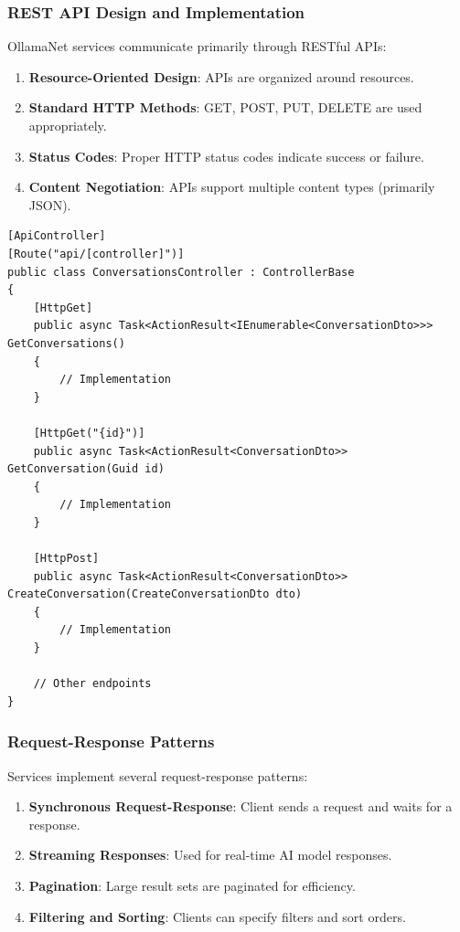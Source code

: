 \subsubsection{REST API Design and Implementation}

OllamaNet services communicate primarily through RESTful APIs:

\begin{enumerate}
   \item \textbf{Resource-Oriented Design}: APIs are organized around resources.
   \item \textbf{Standard HTTP Methods}: GET, POST, PUT, DELETE are used appropriately.
   \item \textbf{Status Codes}: Proper HTTP status codes indicate success or failure.
   \item \textbf{Content Negotiation}: APIs support multiple content types (primarily JSON).
\end{enumerate}

\begin{verbatim}
[ApiController]
[Route("api/[controller]")]
public class ConversationsController : ControllerBase
{
    [HttpGet]
    public async Task<ActionResult<IEnumerable<ConversationDto>>> GetConversations()
    {
        // Implementation
    }
    
    [HttpGet("{id}")]
    public async Task<ActionResult<ConversationDto>> GetConversation(Guid id)
    {
        // Implementation
    }
    
    [HttpPost]
    public async Task<ActionResult<ConversationDto>> CreateConversation(CreateConversationDto dto)
    {
        // Implementation
    }
    
    // Other endpoints
}
\end{verbatim}

\subsubsection{Request-Response Patterns}

Services implement several request-response patterns:

\begin{enumerate}
   \item \textbf{Synchronous Request-Response}: Client sends a request and waits for a response.
   \item \textbf{Streaming Responses}: Used for real-time AI model responses.
   \item \textbf{Pagination}: Large result sets are paginated for efficiency.
   \item \textbf{Filtering and Sorting}: Clients can specify filters and sort orders.
\end{enumerate}

